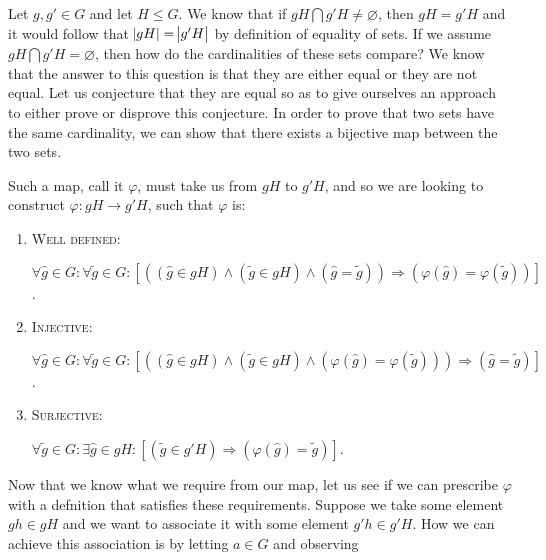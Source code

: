 \documentclass[12pt, a4paper]{article}
\begin{document}
    Let $g,g'\in G$ and let $H\leqslant G$. We know that if $gH\bigcap g'H\neq\varnothing$, then $gH=g'H$ and it would follow that $\abs{gH}=\abs{g'H}$ by definition of equality of sets. If we assume $gH\bigcap g'H=\varnothing$, then how do the cardinalities of these sets compare? We know that the answer to this question is that they are either equal or they are not equal. Let us conjecture that they are equal so as to give ourselves an approach to either prove or disprove this conjecture. In order to prove that two sets have the same cardinality, we can show that there exists a bijective map between the two sets.\par
    
    Such a map, call it $\varphi$, must take us from $gH$ to $g'H$, and so we are looking to construct $\varphi\colon gH\rightarrow g'H$, such that $\varphi$ is:\par
    
\begin{enumerate}

    \item \textsc{Well defined: }\par
    
\vspace{2mm}

        \centerline{$\forall\hat{g}\in G\colon\forall\tilde{g}\in G\colon[((\hat{g}\in gH)\wedge(\tilde{g}\in gH)\wedge(\hat{g}=\tilde{g}))\Rightarrow(\varphi(\hat{g})=\varphi(\tilde{g}))]$.}
        
    \item \textsc{Injective: }\par
    
\vspace{2mm}

        \centerline{$\forall\hat{g}\in G\colon\forall\tilde{g}\in G\colon[((\hat{g}\in gH)\wedge(\tilde{g}\in gH)\wedge(\varphi(\hat{g})=\varphi(\tilde{g})))\Rightarrow(\hat{g}=\tilde{g})]$.}
        
    \item \textsc{Surjective: }\par
    
\vspace{2mm}

        \centerline{$\forall\tilde{g}\in G\colon\exists\hat{g}\in gH\colon[(\tilde{g}\in g'H)\Rightarrow(\varphi(\hat{g})=\tilde{g})]$.}
    
\end{enumerate}

    Now that we know what we require from our map, let us see if we can prescribe $\varphi$ with a defnition that satisfies these requirements. Suppose we take some element $gh\in gH$ and we want to associate it with some element $g'h\in g'H$. How we can achieve this association is by letting $a\in G$ and observing\par
    
\end{document}
